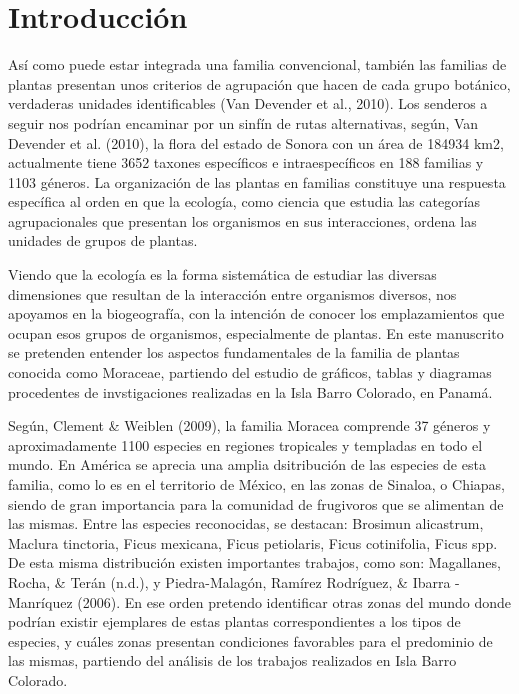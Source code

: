 \documentclass[11pt,]{article}
\begin{document}
\vskip 6.5pt


\noindent  \section{Introducción}\label{introducciuxf3n}

Así como puede estar integrada una familia convencional, también las
familias de plantas presentan unos criterios de agrupación que hacen de
cada grupo botánico, verdaderas unidades identificables (Van Devender et
al., 2010). Los senderos a seguir nos podrían encaminar por un sinfín de
rutas alternativas, según, Van Devender et al. (2010), la flora del
estado de Sonora con un área de 184934 km2, actualmente tiene 3652
taxones específicos e intraespecíficos en 188 familias y 1103 géneros.
La organización de las plantas en familias constituye una respuesta
específica al orden en que la ecología, como ciencia que estudia las
categorías agrupacionales que presentan los organismos en sus
interacciones, ordena las unidades de grupos de plantas.

Viendo que la ecología es la forma sistemática de estudiar las diversas
dimensiones que resultan de la interacción entre organismos diversos,
nos apoyamos en la biogeografía, con la intención de conocer los
emplazamientos que ocupan esos grupos de organismos, especialmente de
plantas. En este manuscrito se pretenden entender los aspectos
fundamentales de la familia de plantas conocida como Moraceae, partiendo
del estudio de gráficos, tablas y diagramas procedentes de
invstigaciones realizadas en la Isla Barro Colorado, en Panamá.

Según, Clement \& Weiblen (2009), la familia Moracea comprende 37
géneros y aproximadamente 1100 especies en regiones tropicales y
templadas en todo el mundo. En América se aprecia una amplia
dsitribución de las especies de esta familia, como lo es en el
territorio de México, en las zonas de Sinaloa, o Chiapas, siendo de gran
importancia para la comunidad de frugivoros que se alimentan de las
mismas. Entre las especies reconocidas, se destacan: Brosimun
alicastrum, Maclura tinctoria, Ficus mexicana, Ficus petiolaris, Ficus
cotinifolia, Ficus spp. De esta misma distribución existen importantes
trabajos, como son: Magallanes, Rocha, \& Terán (n.d.), y
Piedra-Malagón, Ramírez Rodríguez, \& Ibarra -Manríquez (2006). En ese
orden pretendo identificar otras zonas del mundo donde podrían existir
ejemplares de estas plantas correspondientes a los tipos de especies, y
cuáles zonas presentan condiciones favorables para el predominio de las
mismas, partiendo del análisis de los trabajos realizados en Isla Barro
Colorado.
\end{document}
